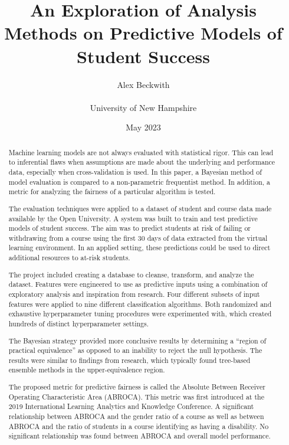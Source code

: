\documentclass{article}
\title{An Exploration of Analysis Methods on Predictive Models of Student Success}
\author{Alex Beckwith\\\\University of New Hampshire}
\date{May 2023}
\begin{document}
\maketitle
\newpage

\tableofcontents

\begin{abstract}
    Machine learning models are not always evaluated with statistical rigor. 
    This can lead to inferential flaws when assumptions are made about the underlying and performance data, especially when cross-validation is used. 
    In this paper, a Bayesian method of model evaluation is compared to a non-parametric frequentist method. 
    In addition, a metric for analyzing the fairness of a particular algorithm is tested. 

    The evaluation techniques were applied to a dataset of student and course data made available by the Open University. 
    A system was built to train and test predictive models of student success. 
    The aim was to predict students at risk of failing or withdrawing from a course using the first 30 days of data extracted from the virtual learning environment. 
    In an applied setting, these predictions could be used to direct additional resources to at-risk students. 

    The project included creating a database to cleanse, transform, and analyze the dataset. 
    Features were engineered to use as predictive inputs using a combination of exploratory analysis and inspiration from research. 
    Four different subsets of input features were applied to nine different classification algorithms. 
    Both randomized and exhaustive hyperparameter tuning procedures were experimented with, which created hundreds of distinct hyperparameter settings.  

    The Bayesian strategy provided more conclusive results by determining a “region of practical equivalence” as opposed to an inability to reject the null hypothesis. 
    The results were similar to findings from research, which typically found tree-based ensemble methods in the upper-equivalence region. 

    The proposed metric for predictive fairness is called the Absolute Between Receiver Operating Characteristic Area (ABROCA). 
    This metric was first introduced at the 2019 International Learning Analytics and Knowledge Conference. 
    A significant relationship between ABROCA and the gender ratio of a course as well as between ABROCA and the ratio of students in a course identifying as having a disability. 
    No significant relationship was found between ABROCA and overall model performance. 
\end{abstract}
\newpage
\end{document}
